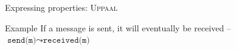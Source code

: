 \documentclass[aspectratio=169]{beamer}
\begin{document}




\begin{slide}{Expressing properties: \textsc{Uppaal}}
\small \centering



\begin{exampleblock}{Example}
  If a message is sent, it will eventually be received -- $\texttt{send(m)} \leadsto \texttt{received(m)}$
\end{exampleblock}

\end{slide}
\end{document}
